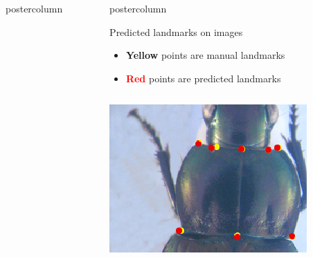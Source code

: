 \begin{frame}
\begin{columns}
\begin{column}{.49\textwidth}
\begin{beamercolorbox}[center,wd=\textwidth]{postercolumn}
\begin{minipage}[T]{.95\textwidth}
{          }
        \end{minipage}
      \end{beamercolorbox}
    \end{column}
    \begin{column}{.49\textwidth}
      \begin{beamercolorbox}[center,wd=\textwidth]{postercolumn}
        \begin{minipage}[T]{.95\textwidth}
          \parbox[t][\columnheight]{\textwidth}{
            
            \begin{block}{Predicted landmarks on images}
            	\begin{itemize}
            		\item \textbf{\textcolor{myyellow}{Yellow}} points are manual landmarks
            		\item \textbf{\textcolor{red}{Red}} points are predicted landmarks
            	\end{itemize}
            	\begin{columns}
            		\begin{column}{.45\textwidth}
            			\centering
            			\includegraphics[width=.95\textwidth]{images/Prono_115.eps}
            		\end{column}
            		\begin{column}{.45\textwidth}
            			\centering

\end{column}
\end{columns}
\end{block}}
\end{minipage}
\end{beamercolorbox}
\end{column}
\end{columns}
\end{frame}
